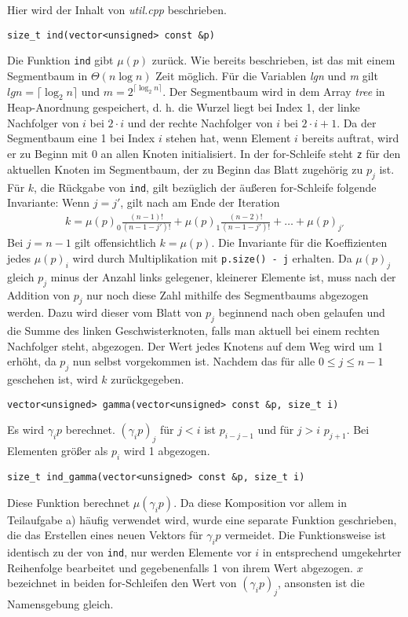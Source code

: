 \documentclass[a4paper, 10pt, ngerman]{article}
\begin{document}
Hier wird der Inhalt von \emph{util.cpp} beschrieben.
\medskip

\noindent \verb|size_t ind(vector<unsigned> const &p)|
\smallskip

\noindent Die Funktion \verb|ind| gibt $\mu(p)$ zurück. Wie bereits beschrieben, ist das mit einem Segmentbaum in $\Theta(n \log n)$ Zeit möglich. Für die Variablen \emph{lgn} und \emph{m} gilt $lgn = \lceil \log_2 n \rceil$ und $m = 2^{\lceil \log_2 n \rceil}$. Der Segmentbaum wird in dem Array \emph{tree} in Heap-Anordnung gespeichert, d. h. die Wurzel liegt bei Index 1, der linke Nachfolger von $i$ bei $2 \cdot i$ und der rechte Nachfolger von $i$ bei $2 \cdot i + 1$. Da der Segmentbaum eine 1 bei Index $i$ stehen hat, wenn Element $i$ bereits auftrat, wird er zu Beginn mit 0 an allen Knoten initialisiert. In der for-Schleife steht \verb|z| für den aktuellen Knoten im Segmentbaum, der zu Beginn das Blatt zugehörig zu $p_j$ ist. Für $k$, die Rückgabe von \verb|ind|, gilt bezüglich der äußeren for-Schleife folgende Invariante: Wenn $j = j'$, gilt nach am Ende der Iteration
\begin{align*}
    k = \mu(p)_0 \frac {(n - 1)!} {(n - 1 - j')!} + \mu(p)_1 \frac {(n - 2)!} {(n - 1 - j')!} + \dots + \mu(p)_{j'}
\end{align*}
Bei $j = n - 1$ gilt offensichtlich $k = \mu(p)$. Die Invariante für die Koeffizienten jedes $\mu(p)_i$ wird durch Multiplikation mit \verb|p.size() - j| erhalten. Da $\mu(p)_j$ gleich $p_j$ minus der Anzahl links gelegener, kleinerer Elemente ist, muss nach der Addition von $p_j$ nur noch diese Zahl mithilfe des Segmentbaums abgezogen werden. Dazu wird dieser vom Blatt von $p_j$ beginnend nach oben gelaufen und die Summe des linken Geschwisterknoten, falls man aktuell bei einem rechten Nachfolger steht, abgezogen. Der Wert jedes Knotens auf dem Weg wird um 1 erhöht, da $p_j$ nun selbst vorgekommen ist. Nachdem das für alle $0 \le j \le n - 1$ geschehen ist, wird $k$ zurückgegeben.
\bigskip

\noindent \verb|vector<unsigned> gamma(vector<unsigned> const &p, size_t i)|
\smallskip

\noindent Es wird $\gamma_i p$ berechnet. $(\gamma_i p)_j$ für $j < i$ ist $p_{i - j - 1}$ und für $j > i$ $p_{j + 1}$. Bei Elementen größer als $p_i$ wird 1 abgezogen.
\bigskip

\noindent \verb|size_t ind_gamma(vector<unsigned> const &p, size_t i)|
\smallskip

\noindent Diese Funktion berechnet $\mu(\gamma_i p)$. Da diese Komposition vor allem in Teilaufgabe a) häufig verwendet wird, wurde eine separate Funktion geschrieben, die das Erstellen eines neuen Vektors für $\gamma_i p$ vermeidet. Die Funktionsweise ist identisch zu der von \verb|ind|, nur werden Elemente vor $i$ in entsprechend umgekehrter Reihenfolge bearbeitet und gegebenenfalls 1 von ihrem Wert abgezogen. $x$ bezeichnet in beiden for-Schleifen den Wert von $(\gamma_i p)_j$, ansonsten ist die Namensgebung gleich.
\bigskip
\end{document}
